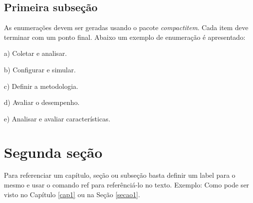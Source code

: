 \subsection{Primeira subseção}
  
  As enumerações devem ser geradas usando o pacote \textit{compactitem}. Cada item deve terminar com um ponto final.
  Abaixo um exemplo de enumeração é apresentado:

    \begin{compactitem}
      \item[a)] Coletar e analisar.
      \item[b)] Configurar e simular.
      \item[c)] Definir a metodologia.
      \item[d)] Avaliar o desempenho.
      \item[e)] Analisar e avaliar características.
    \end{compactitem}

\section{Segunda seção}

  Para referenciar um capítulo, seção ou subseção basta definir um label para o mesmo e usar o comando ref para referênciá-lo
  no texto. Exemplo: Como pode ser visto no Capítulo \ref{cap1} ou na Seção \ref{secao1}.